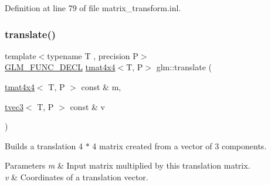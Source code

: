 Definition at line 79 of file matrix\+\_\+transform.\+inl.

\mbox{\label{group__gtc__matrix__transform_gaee134ab77c6c5548a6ebf4e8e476c6ed}} 
\subsubsection{\texorpdfstring{translate()}{translate()}}
{\footnotesize\ttfamily template$<$typename T , precision P$>$ \\
\mbox{\hyperlink{setup_8hpp_ab2d052de21a70539923e9bcbf6e83a51}{G\+L\+M\+\_\+\+F\+U\+N\+C\+\_\+\+D\+E\+CL}} \mbox{\hyperlink{structglm_1_1tmat4x4}{tmat4x4}}$<$T, P$>$ glm\+::translate (\begin{DoxyParamCaption}\item[{\mbox{\hyperlink{structglm_1_1tmat4x4}{tmat4x4}}$<$ T, P $>$ const \&}]{m,  }\item[{\mbox{\hyperlink{structglm_1_1tvec3}{tvec3}}$<$ T, P $>$ const \&}]{v }\end{DoxyParamCaption})}

Builds a translation 4 $\ast$ 4 matrix created from a vector of 3 components.


\begin{DoxyParams}{Parameters}
{\em m} & Input matrix multiplied by this translation matrix. \\
\hline
{\em v} & Coordinates of a translation vector. \\
\hline
\end{DoxyParams}

